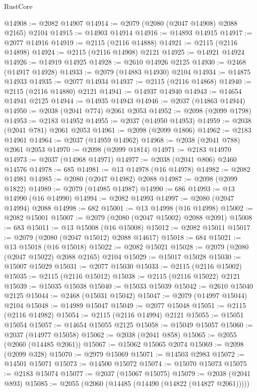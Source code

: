 \begin{lexlean}{RustCore}
\begin{coremodule}
@14908 := @2082 @14907
@14914 := @2079 (@2080 (@2047 @14908) @2088 @2165) @2104
@14915 := @14903 @14914
@14916 := @14893 @14915
@14917 := @2077 @14916
@14919 := @2115 (@2116 @14888)
@14921 := @2115 (@2116 @14898)
@14924 := @2115 (@2116 @14908) @2121
@14925 := @14921 @14924
@14926 := @14919 @14925
@14928 := @2610 @14926 @2125
@14930 := @2468 (@14917 @14928)
@14933 := @2079 (@14883 @14930) @2104
@14934 := @14875 @14933
@14935 := @2077 @14934
@14937 := @2115 (@2116 @14868)
@14940 := @2115 (@2116 @14880) @2121
@14941 := @14937 @14940
@14943 := @14654 @14941 @2125
@14944 := @14935 @14943
@14946 := @2037 (@14863 @14944)
@14950 := @2038 (@2041 @774) @2061 @2053
@14952 := @2098 (@2099 @1798)
@14953 := @2183 @14952
@14955 := @2037 (@14950 @14953)
@14959 := @2038 (@2041 @781) @2061 @2053
@14961 := @2098 (@2099 @1806)
@14962 := @2183 @14961
@14964 := @2037 (@14959 @14962)
@14968 := @2038 (@2041 @788) @2061 @2053
@14970 := @2098 (@2099 @1814)
@14971 := @2183 @14970
@14973 := @2037 (@14968 @14971)
@14977 := @2038 (@2041 @806) @2460 @14576
@14978 := 685
@14981 := @13 @14978 (@16 @14978)
@14982 := @2082 @14981
@14985 := @2080 (@2047 @14982) @2088
@14987 := @2098 (@2099 @1822)
@14989 := @2079 (@14985 @14987)
@14990 := 686
@14993 := @13 @14990 (@16 @14990)
@14994 := @2082 @14993
@14997 := @2080 (@2047 @14994) @2088
@14998 := 682
@15001 := @13 @14998 (@16 @14998)
@15002 := @2082 @15001
@15007 := @2079 (@2080 (@2047 @15002) @2088 @2091)
@15008 := 683
@15011 := @13 @15008 (@16 @15008)
@15012 := @2082 @15011
@15017 := @2079 (@2080 (@2047 @15012) @2088 @14617)
@15018 := 684
@15021 := @13 @15018 (@16 @15018)
@15022 := @2082 @15021
@15028 := @2079 (@2080 (@2047 @15022) @2088 @2165) @2104
@15029 := @15017 @15028
@15030 := @15007 @15029
@15031 := @2077 @15030
@15033 := @2115 (@2116 @15002)
@15035 := @2115 (@2116 @15012)
@15038 := @2115 (@2116 @15022) @2121
@15039 := @15035 @15038
@15040 := @15033 @15039
@15042 := @2610 @15040 @2125
@15044 := @2468 (@15031 @15042)
@15047 := @2079 (@14997 @15044) @2104
@15048 := @14989 @15047
@15049 := @2077 @15048
@15051 := @2115 (@2116 @14982)
@15054 := @2115 (@2116 @14994) @2121
@15055 := @15051 @15054
@15057 := @14654 @15055 @2125
@15058 := @15049 @15057
@15060 := @2037 (@14977 @15058)
@15062 := @2038 (@2041 @858)
@15065 := @2055 (@2060 (@14485 @2061))
@15067 := @15062 @15065 @2074
@15069 := @2098 (@2099 @328)
@15070 := @2979 @15069
@15071 := @14503 @2983
@15072 := @14501 @15071
@15073 := @14500 @15072
@15074 := @15070 @15073
@15075 := @2183 @15074
@15077 := @2037 (@15067 @15075)
@15079 := @2038 (@2041 @893)
@15085 := @2055 (@2060 (@14485 (@14490 (@14822 (@14827 @2061)))))

\end{coremodule}
\end{lexlean}
